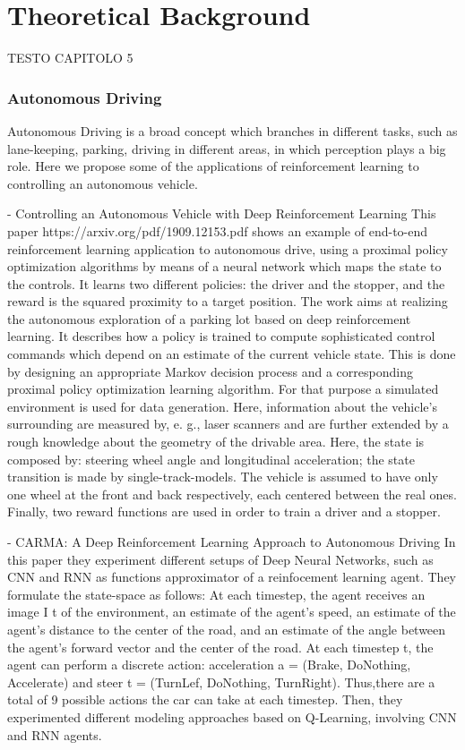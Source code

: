 \chapter{Theoretical Background}
\label{Theoretical Background}
\thispagestyle{empty}

TESTO CAPITOLO 5

\subsection{Autonomous Driving}
Autonomous Driving is a broad concept which branches in different tasks, such as lane-keeping, parking, driving in different areas, in which perception plays a big role.
Here we propose some of the applications of reinforcement learning to controlling an autonomous vehicle.

- Controlling an Autonomous Vehicle with Deep Reinforcement Learning
This paper https://arxiv.org/pdf/1909.12153.pdf shows an example of end-to-end reinforcement learning application to autonomous drive, using a proximal policy optimization algorithms by means of a neural network which maps the state to the controls. It learns two different policies: the driver and the stopper, and the reward is the squared proximity to a target position. The work aims at realizing the autonomous exploration of a parking lot based on deep reinforcement learning. It describes how a policy is trained to compute sophisticated control commands which depend on an estimate of the current vehicle state. This is done by designing an appropriate Markov decision process and a corresponding proximal policy optimization learning algorithm. For that purpose a simulated environment is used for data generation. Here, information about the vehicle's surrounding are measured by, e. g., laser scanners and are further extended by a rough knowledge about the geometry of the drivable area.
Here, the state is composed by: steering wheel angle and longitudinal acceleration; the state transition is made by single-track-models. The vehicle is assumed to have only one wheel at the front and back respectively, each centered between the real ones. Finally, two reward functions are used in order to train a driver and a stopper.



- CARMA: A Deep Reinforcement Learning Approach to Autonomous Driving
In this paper they experiment different setups of Deep Neural Networks, such as CNN and RNN as functions approximator of a reinfocement learning agent.
They formulate the state-space as follows: At each timestep, the agent receives an image I t of the environment, an estimate of the agent's speed, an estimate of the agent's distance to the center of the road, and an estimate of the angle between the agent's forward vector and the center of the road. At each timestep t, the agent can perform a discrete action: acceleration a = (Brake, DoNothing, Accelerate) and steer t = (TurnLef, DoNothing, TurnRight). Thus,there are a total of 9 possible actions the car can take at each timestep.
Then, they experimented different modeling approaches based on Q-Learning, involving CNN and RNN agents.


